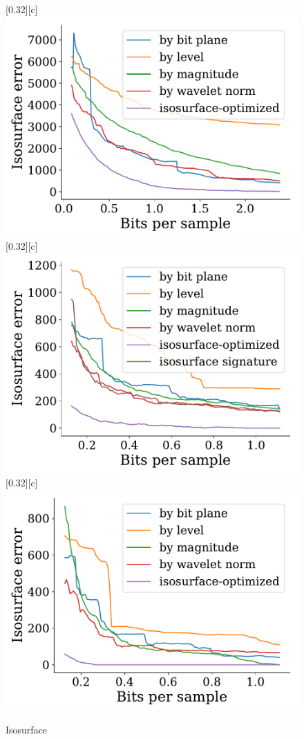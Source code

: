 \documentclass{article}
\begin{document}
\begin{figure}[htb]
        [0.32\linewidth][c]{%
               \includegraphics[width=0.3\linewidth]{img/supplementary/isocontour-optimized-enzo-v}}
        [0.32\linewidth][c]{%
               \includegraphics[width=0.3\linewidth]{img/supplementary/isocontour-optimized-foam}}
        [0.32\linewidth][c]{%
                \includegraphics[width=0.3\linewidth]{img/supplementary/isocontour-optimized-karfs}}
        \caption{Isosurface}
\end{figure}
\end{document}

